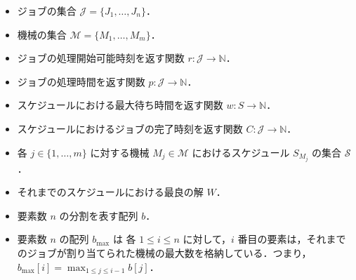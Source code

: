 \documentclass[12pt]{optlab-bachelor}
\begin{document}
\begin{itemize}
  \item ジョブの集合 $\mathcal{J} = \{J_1,\ldots,J_n\}$．
  \item 機械の集合 $\mathcal{M} = \{M_1,\ldots,M_m\}$．
  \item ジョブの処理開始可能時刻を返す関数 $r : \mathcal{J} \to \mathbb{N}$．
  \item ジョブの処理時間を返す関数 $p : \mathcal{J} \to \mathbb{N}$．
  \item スケジュールにおける最大待ち時間を返す関数 $w : S \to \mathbb{N}$．
  \item スケジュールにおけるジョブの完了時刻を返す関数 $C : \mathcal{J} \to \mathbb{N}$．
  \item 各 $j \in \{1,\ldots,m\}$ に対する機械 $M_j \in \mathcal{M}$ におけるスケジュール $S_{M_j}$ の集合 $\mathcal{S}$．
  \item それまでのスケジュールにおける最良の解 $W$．
  \item 要素数 $n$ の分割を表す配列 $b$．
  \item 要素数 $n$ の配列 $b_{\max}$ は 各 $1 \le i \le n$ に対して，$i$ 番目の要素は，それまでのジョブが割り当てられた機械の最大数を格納している．つまり，$b_{\max}[i] = \displaystyle \max_{1\le j \le i - 1}b[j]$．
\end{itemize}
\end{document}
